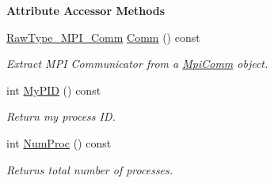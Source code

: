 \begin{Indent}{\bf Attribute Accessor Methods}\par
\begin{DoxyCompactItemize}
\item 
\hyperlink{namespace_q_u_e_s_o_af48741a7e6d7897e9e96e0f5bb26cfd7}{Raw\-Type\-\_\-\-M\-P\-I\-\_\-\-Comm} \hyperlink{class_q_u_e_s_o_1_1_mpi_comm_a29d53c01c5ac7ba1bb3a33911d89b6b8}{Comm} () const 
\begin{DoxyCompactList}\small\item\em Extract M\-P\-I Communicator from a \hyperlink{class_q_u_e_s_o_1_1_mpi_comm}{Mpi\-Comm} object. \end{DoxyCompactList}\item 
int \hyperlink{class_q_u_e_s_o_1_1_mpi_comm_ab806f80f206210723fcb4df8185a55a8}{My\-P\-I\-D} () const 
\begin{DoxyCompactList}\small\item\em Return my process I\-D. \end{DoxyCompactList}\item 
int \hyperlink{class_q_u_e_s_o_1_1_mpi_comm_aa780721ae0fdeabc5a15e04cb0cad964}{Num\-Proc} () const 
\begin{DoxyCompactList}\small\item\em Returns total number of processes. \end{DoxyCompactList}\end{DoxyCompactItemize}
\end{Indent}
